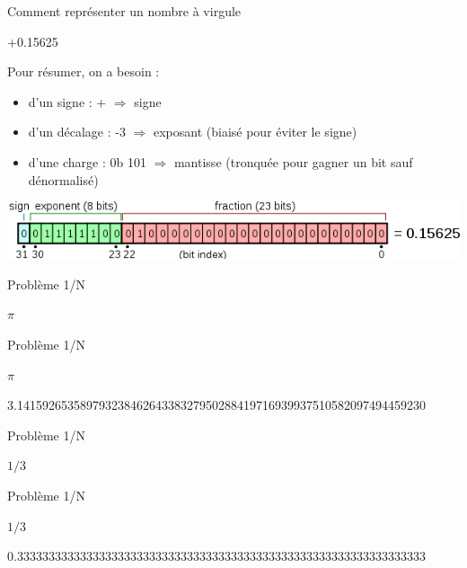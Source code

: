 \documentclass{beamer}
\begin{document}
  \begin{frame}{Comment représenter un nombre à virgule} 
    \begin{Huge}
    \begin{center}
    +0.15625
    \end{center}
    \end{Huge}
Pour résumer, on a besoin : 
    \begin{itemize}
      \item d'un signe : + $\Rightarrow$ signe
      \item d'un décalage : -3 $\Rightarrow$ exposant (biaisé pour éviter le signe)
      \item d'une charge : 0b 101 $\Rightarrow$ mantisse (tronquée pour gagner un bit sauf dénormalisé)
    \end{itemize}
    
    \includegraphics[width=\textwidth]{float_representation}
  \end{frame}
  
  \begin{frame}{Problème 1/N} 
    \begin{center}
      \fontsize{100}{110}\selectfont $\pi$ 
    \end{center}
  \end{frame}
  
  \begin{frame}{Problème 1/N} 
    \begin{center}
      \fontsize{100}{110}\selectfont $\pi$ 
    \end{center}
    \begin{center}
      3.14159265358979323846264338327950288419716939937510582097494459230
    \end{center}
  \end{frame}
  
  \begin{frame}{Problème 1/N} 
    \begin{center}
      \fontsize{100}{110}\selectfont $1/3$
    \end{center}
  \end{frame}
  
  \begin{frame}{Problème 1/N} 
    \begin{center}
      \fontsize{100}{110}\selectfont $1/3$
    \end{center}
    \begin{center}
      0.33333333333333333333333333333333333333333333333333333333333333333
    \end{center}
  \end{frame}
  
\end{document}
